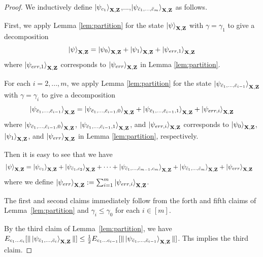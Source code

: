 \begin{proof}
We inductively define $\ket{\psi_{c_1}}_{\mathbf{X},\mathbf{Z}}$,...,$\ket{\psi_{\bar{c}_1,...,\bar{c}_m}}_{\mathbf{X},\mathbf{Z}}$ as follows.

First, we apply Lemma \ref{lem:partition} for the state $\ket{\psi}_{\mathbf{X},\mathbf{Z}}$ with $\gamma=\gamma_1$ to give a decomposition
\begin{align*}
\ket{\psi}_{\mathbf{X},\mathbf{Z}}=\ket{\psi_0}_{\mathbf{X},\mathbf{Z}}+\ket{\psi_1}_{\mathbf{X},\mathbf{Z}} + \ket{\psi_{err,1}}_{\mathbf{X},\mathbf{Z}} 
\end{align*}
where $\ket{\psi_{err,1}}_{\mathbf{X},\mathbf{Z}}$ corresponds to $\ket{\psi_{err}}_{\mathbf{X},\mathbf{Z}}$ in Lemma \ref{lem:partition}.

For each $i=2,...,m$, we apply  Lemma \ref{lem:partition} for the state $\ket{\psi_{\bar{c}_1,...,\bar{c}_{i-1}}}_{\mathbf{X},\mathbf{Z}}$ with $\gamma=\gamma_i$ to give a decomposition 
\begin{align*}
\ket{\psi_{\bar{c}_1,...,\bar{c}_{i-1}}}_{\mathbf{X},\mathbf{Z}}=\ket{\psi_{\bar{c}_1,...,\bar{c}_{i-1},0}}_{\mathbf{X},\mathbf{Z}}+\ket{\psi_{\bar{c}_1,...,\bar{c}_{i-1},1}}_{\mathbf{X},\mathbf{Z}} + \ket{\psi_{err,i}}_{\mathbf{X},\mathbf{Z}} 
\end{align*}  
where 
$\ket{\psi_{\bar{c}_1,...,\bar{c}_{i-1},0}}_{\mathbf{X},\mathbf{Z}}$, $\ket{\psi_{\bar{c}_1,...,\bar{c}_{i-1},1}}_{\mathbf{X},\mathbf{Z}}$, and $\ket{\psi_{err,i}}_{\mathbf{X},\mathbf{Z}}$ corresponds to $\ket{\psi_{0}}_{\mathbf{X},\mathbf{Z}}$, $\ket{\psi_{1}}_{\mathbf{X},\mathbf{Z}}$, and $\ket{\psi_{err}}_{\mathbf{X},\mathbf{Z}}$ in Lemma \ref{lem:partition}, respectively.
  
 Then it is easy to see that we have
 \begin{align*}
    & \ket{\psi}_{\mathbf{X},\mathbf{Z}} = \ket{\psi_{c_1}}_{\mathbf{X},\mathbf{Z}} + \ket{\psi_{\bar{c}_1,c_2}}_{\mathbf{X},\mathbf{Z}} + \cdots +\ket{\psi_{\bar{c}_1,\dots,\bar{c}_{m-1},c_m}}_{\mathbf{X},\mathbf{Z}} + \ket{\psi_{\bar{c}_1,\dots,\bar{c}_m}}_{\mathbf{X},\mathbf{Z}}+ \ket{\psi_{err}}_{\mathbf{X},\mathbf{Z}}
\end{align*}
where we define $\ket{\psi_{err}}_{\mathbf{X},\mathbf{Z}}:= \sum_{i=1}^{m}\ket{\psi_{err,i}}_{\mathbf{X},\mathbf{Z}}$. 
  
The first and second claims immediately follow from the forth and fifth claims of Lemma~\ref{lem:partition} and $\gamma_i\leq \gamma_0$ for each $i\in[m]$.  

By the third claim of  Lemma~\ref{lem:partition}, we have $E_{c_1...c_{i}}[\|\ket{\psi_{\bar{c}_1,...,\bar{c}_{i}}}_{\mathbf{X},\mathbf{Z}}\|]\leq \frac{1}{2}E_{c_1...c_{i-1}}[\|\ket{\psi_{\bar{c}_1,...,\bar{c}_{i-1}}}_{\mathbf{X},\mathbf{Z}}\|]$.
Ths implies the third claim.


\end{proof}

